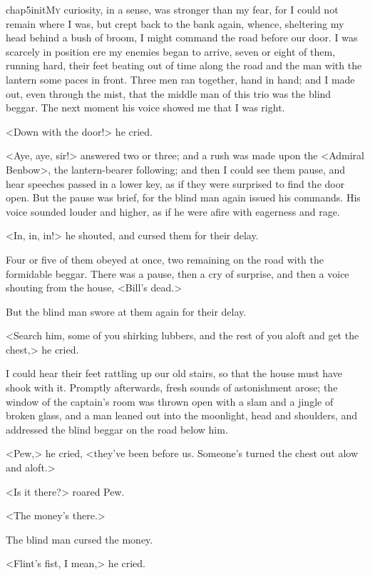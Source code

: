 
\lettrine{chap5initM}{y} curiosity, in a sense, was stronger than my fear, for I could not remain where I was, but crept back to the bank again, whence, sheltering my head behind a bush of broom, I might command the road before our door. I was scarcely in position ere my enemies began to arrive, seven or eight of them, running hard, their feet beating out of time along the road and the man with the lantern some paces in front. Three men ran together, hand in hand; and I made out, even through the mist, that the middle man of this trio was the blind beggar. The next moment his voice showed me that I was right.

<Down with the door!> he cried.

<Aye, aye, sir!> answered two or three; and a rush was made upon the <Admiral Benbow>, the lantern-bearer following; and then I could see them pause, and hear speeches passed in a lower key, as if they were surprised to find the door open. But the pause was brief, for the blind man again issued his commands. His voice sounded louder and higher, as if he were afire with eagerness and rage.

<In, in, in!> he shouted, and cursed them for their delay.

Four or five of them obeyed at once, two remaining on the road with the formidable beggar. There was a pause, then a cry of surprise, and then a voice shouting from the house, <Bill's dead.>

But the blind man swore at them again for their delay.

<Search him, some of you shirking lubbers, and the rest of you aloft and get the chest,> he cried.

I could hear their feet rattling up our old stairs, so that the house must have shook with it. Promptly afterwards, fresh sounds of astonishment arose; the window of the captain's room was thrown open with a slam and a jingle of broken glass, and a man leaned out into the moonlight, head and shoulders, and addressed the blind beggar on the road below him.

<Pew,> he cried, <they've been before us. Someone's turned the chest out alow and aloft.>

<Is it there?> roared Pew.

<The money's there.>

The blind man cursed the money.

<Flint's fist, I mean,> he cried.

